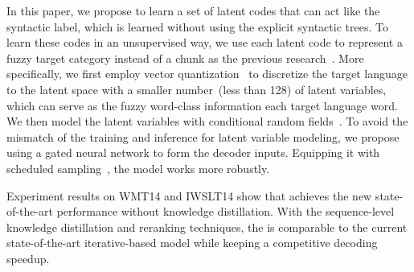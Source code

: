 In this paper, we propose to learn a set of latent codes that can act like the syntactic label, which is learned without using the explicit syntactic trees. 
To learn these codes in an unsupervised way, we use each latent code to represent a fuzzy target category instead of a chunk as the previous research~\cite{syn_st}.
More specifically, we first employ vector quantization~\cite{vqvae} to discretize the target language to the latent space with a smaller number~(less than 128) of latent variables, which can serve as the fuzzy word-class information each target language word.
We then model the latent variables with conditional random fields~\cite[CRF,][]{crf,nat_crf}.
To avoid the mismatch of the training and inference for latent variable modeling, we propose using a gated neural network to form the decoder inputs. 
Equipping it with scheduled sampling~\cite{bengio2015scheduled}, the model works more robustly.

Experiment results on WMT14 and IWSLT14 show that \method achieves the new state-of-the-art performance without knowledge distillation. 
With the sequence-level knowledge distillation and reranking techniques, the \method is comparable to the current state-of-the-art iterative-based model while keeping a competitive decoding speedup.

